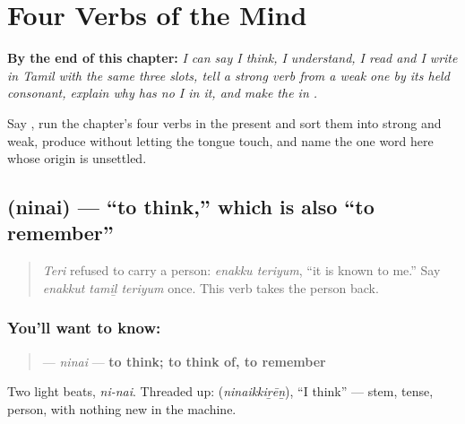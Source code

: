
\chapter{Four Verbs of the Mind}
\label{ch:ta-verbs-of-the-mind}

\begin{chapteropening}
\textbf{By the end of this chapter:} \emph{I can say I think, I understand, I read and I write in Tamil with the same three slots, tell a strong verb from a weak one by its held consonant, explain why   has no I in it, and make the  in .}

Say   , run the chapter's four verbs in the present and sort them into strong and weak, produce  without letting the tongue touch, and name the one word here whose origin is unsettled.
\end{chapteropening}

\section[\texorpdfstring{\ta{நினை} (ninai)}{நினை (ninai)}]{ (ninai) — \textquotedblleft{}to think,\textquotedblright{} which is also \textquotedblleft{}to remember\textquotedblright{}}

\label{lesson:TA-C33-ninai}



\begin{quote}
\emph{Teri} refused to carry a person: \emph{enakku teriyum}, \textquotedblleft{}it is known to me.\textquotedblright{} Say \emph{enakkut tamiḻ teriyum} once. This verb takes the person back.
\end{quote}

\subsection*{You'll want to know: }
\begin{quote}
\textbf{} — \emph{ninai} — \textbf{to think; to think of, to remember}
\end{quote}

Two light beats, \emph{ni-nai}. Threaded up: \textbf{} (\emph{ninaikkiṟēṉ}), \textquotedblleft{}I think\textquotedblright{} — stem, tense, person, with nothing new in the machine.


